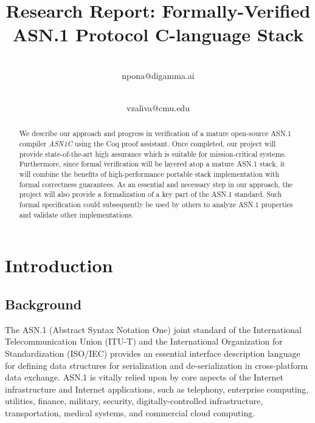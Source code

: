 \documentclass[10p,conference]{IEEEtran}
\begin{document}
\title{Research Report: Formally-Verified ASN.1 Protocol C-language Stack}

\author{
 \\ npona@digamma.ai
\and
{}
\\vzaliva@cmu.edu
}

\maketitle

\begin{abstract}

  We describe our approach and progress in verification of a
  mature open-source ASN.1 compiler \emph{ASN1C} using the Coq proof
  assistant. Once completed, our project will provide state-of-the-art
  high assurance which is suitable for mission-critical systems. Furthermore, since
  formal verification will be layered atop a mature ASN.1
  stack, it will combine the benefits of high-performance portable
  stack implementation with formal correctness guarantees. As an essential and necessary step in our
  approach, the project will also provide a formalization of a key part of
  the ASN.1 standard. Such formal specification could subsequently be
  used by others to analyze ASN.1 properties and validate other
  implementations.
\end{abstract}

\section{Introduction}

\subsection{Background}

The ASN.1 (Abstract Syntax
Notation One) \cite{ASN1Intro} joint standard of the International
Telecommunication Union (ITU-T) and the International Organization for
Standardization (ISO/IEC) provides an essential interface description
language for defining data structures for serialization and
de-serialization in cross-platform data exchange.
 ASN.1 is vitally relied upon by core aspects of the
Internet infrastructure and Internet applications, such as telephony,
enterprise computing, utilities, finance, military, security,
digitally-controlled infrastructure, transportation, medical systems,
and commercial cloud computing.
\end{document}
